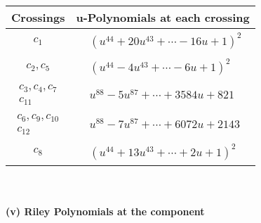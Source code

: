 \documentclass[1p]{elsarticle_modified}
\theoremstyle{definition}
\begin{document}
\begin{tabular}{m{50pt}|m{274pt}}
Crossings & \hspace{64pt}u-Polynomials at each crossing \\
\hline $$\begin{aligned}c_{1}\end{aligned}$$&$\begin{aligned}
&(u^{44}+20 u^{43}+\cdots-16 u+1)^{2}
\end{aligned}$\\
\hline $$\begin{aligned}c_{2},c_{5}\end{aligned}$$&$\begin{aligned}
&(u^{44}-4 u^{43}+\cdots-6 u+1)^{2}
\end{aligned}$\\
\hline $$\begin{aligned}c_{3},c_{4},c_{7}\\c_{11}\end{aligned}$$&$\begin{aligned}
&u^{88}-5 u^{87}+\cdots+3584 u+821
\end{aligned}$\\
\hline $$\begin{aligned}c_{6},c_{9},c_{10}\\c_{12}\end{aligned}$$&$\begin{aligned}
&u^{88}-7 u^{87}+\cdots+6072 u+2143
\end{aligned}$\\
\hline $$\begin{aligned}c_{8}\end{aligned}$$&$\begin{aligned}
&(u^{44}+13 u^{43}+\cdots+2 u+1)^{2}
\end{aligned}$\\
\hline
\end{tabular}\\~\\
\newpage\renewcommand{\arraystretch}{1}
\flushleft \textbf{(v) Riley Polynomials at the component}\newline \\
\end{document}
